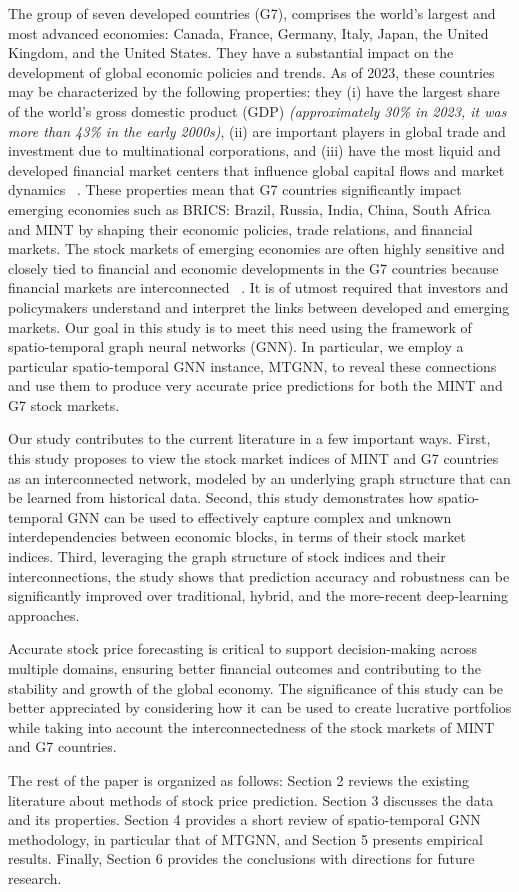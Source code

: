 The group of seven developed countries (G7), comprises the world's largest and
most advanced economies: Canada, France, Germany, Italy, Japan, the
United Kingdom, and the United States. They have a substantial impact on the
development of global economic policies and trends.  As of 2023, these countries may be characterized by the following properties: they
(i) have the largest share of the world's gross domestic product (GDP)
\textit{(approximately 30\% in 2023, it was more than 43\% in the early 2000s)},
(ii) are important players in global trade and investment due to
multinational corporations, and (iii) have the most liquid and developed
financial market centers that influence global capital flows and market dynamics
~\citep{World, United,
Statista}. These properties mean that G7 countries significantly impact emerging
economies such as BRICS: Brazil, Russia, India, China, South Africa and MINT by
shaping their economic policies, trade relations, and financial markets.
The stock markets of emerging economies are often highly sensitive
and closely tied to financial and economic developments in the G7 countries
because financial markets are interconnected ~\citep{fratzscher2012capital,
rey2015dilemma, acharya2020financial}. It is of utmost required that
investors and policymakers understand and interpret the links between developed
and emerging markets. Our goal in this study is to meet this need using the 
framework of spatio-temporal graph neural networks (GNN). In particular, we
employ a particular spatio-temporal GNN instance, MTGNN,  to reveal these
connections~\citep{wu2020connecting} and use them to produce very accurate 
price predictions for both the MINT and G7 stock markets.

Our study contributes to the current literature in a few important ways. First,
this study proposes to view the stock market indices of MINT and G7 countries 
as an interconnected network, modeled by an underlying graph structure that 
can be learned from historical data.
Second, this study demonstrates how spatio-temporal GNN can be used to 
effectively  capture complex and unknown interdependencies between economic
blocks, in terms of their stock market indices. Third, leveraging the graph
structure of stock indices and their interconnections, the study shows that 
prediction accuracy and robustness can be significantly improved over
traditional, hybrid, and the more-recent deep-learning approaches.

Accurate stock price forecasting is critical to support decision-making across
multiple domains, ensuring better financial outcomes and contributing to the
stability and growth of the global economy. The significance of this study can
be better appreciated by considering how it can be used to create lucrative
portfolios while taking into account the interconnectedness of the stock markets
of MINT and G7 countries. 

The rest of the paper is organized as follows: Section 2 reviews the existing
literature about methods of stock price prediction. Section 3 discusses the data
and its properties. Section 4 provides a short review of spatio-temporal GNN
methodology, in particular that of MTGNN, and Section 5 presents empirical
results. Finally, Section 6 provides the conclusions with directions for
future research.

